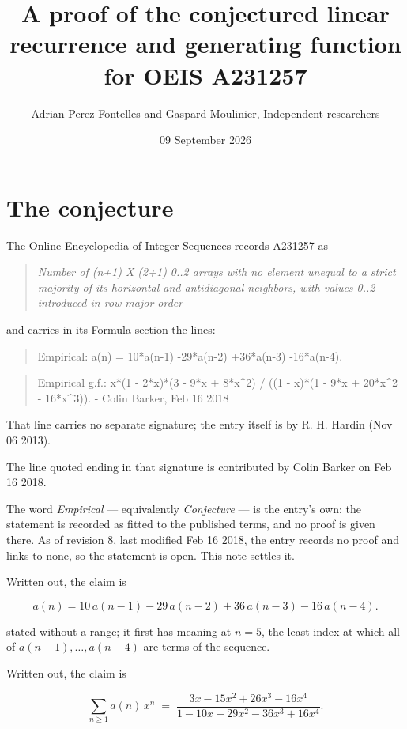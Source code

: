 \documentclass[11pt]{article}
\title{A proof of the conjectured linear recurrence and generating function for OEIS A231257}
\author{Adrian Perez Fontelles and Gaspard Moulinier, Independent researchers}
\date{09 September 2026}
\theoremstyle{definition}
\begin{document}
\maketitle
\section{The conjecture}

The Online Encyclopedia of Integer Sequences records \href{https://oeis.org/A231257}{A231257} as

\begin{quote}\itshape Number of (n+1) X (2+1) 0..2 arrays with no element unequal to a strict majority of its horizontal and antidiagonal neighbors, with values 0..2 introduced in row major order\end{quote}

and carries in its Formula section the lines:

\begin{quote}\ttfamily Empirical: a(n) = 10*a(n-1) -29*a(n-2) +36*a(n-3) -16*a(n-4).\end{quote}

\begin{quote}\ttfamily Empirical g.f.: x*(1 - 2*x)*(3 - 9*x + 8*x\textasciicircum{}2) / ((1 - x)*(1 - 9*x + 20*x\textasciicircum{}2 - 16*x\textasciicircum{}3)). - Colin Barker, Feb 16 2018\end{quote}

That line carries no separate signature; the entry itself is by R. H. Hardin (Nov 06 2013).

The line quoted ending in that signature is contributed by Colin Barker on Feb 16 2018.

The word {\itshape Empirical} --- equivalently {\itshape Conjecture} --- is the entry's own: the statement is recorded as fitted to the published terms, and no proof is given there. As of revision 8, last modified Feb 16 2018, the entry records no proof and links to none, so the statement is open. This note settles it.

Written out, the claim is

\[a(n) = 10\,a(n-1) - 29\,a(n-2) + 36\,a(n-3) - 16\,a(n-4).\]

stated without a range; it first has meaning at $n = 5$, the least index at which all of $a(n-1),\dots,a(n-4)$ are terms of the sequence.

Written out, the claim is

\[\sum_{n \ge 1} a(n)\,x^n \;=\; \frac{3x - 15x^{2} + 26x^{3} - 16x^{4}}{1 - 10x + 29x^{2} - 36x^{3} + 16x^{4}}.\]
\end{document}
